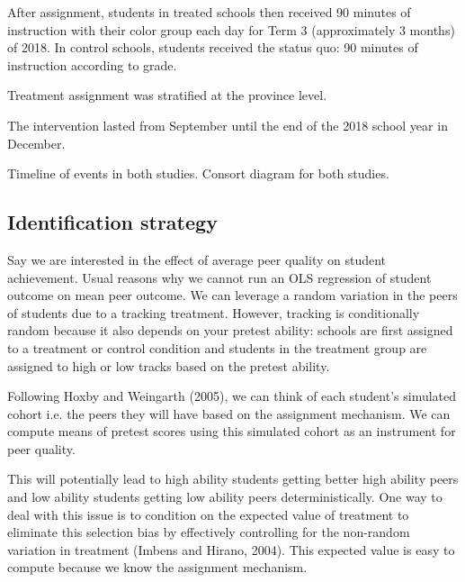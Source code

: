 \documentclass[11pt]{article}
\begin{document}
After assignment, students in treated schools then received 90 minutes of instruction with their color group each day for Term 3 (approximately 3 months) of 2018. In control schools, students received the status quo: 90 minutes of instruction according to grade.

Treatment assignment was stratified at the province level. 

The intervention lasted from September until the end of the 2018 school year in December. 

Timeline of events in both studies.
Consort diagram for both studies.

\subsection{Identification strategy}

Say we are interested in the effect of average peer quality on student achievement. Usual reasons why we cannot run an OLS regression of student outcome on mean peer outcome. We can leverage a random variation in the peers of students due to a tracking treatment. However, tracking is conditionally random because it also depends on your pretest ability: schools are first assigned to a treatment or control condition and students in the treatment group are assigned to high or low tracks based on the pretest ability. 

Following Hoxby and Weingarth (2005), we can think of each student's simulated cohort i.e. the peers they will have based on the assignment mechanism. We can compute means of pretest scores using this simulated cohort as an instrument for peer quality. 

This will potentially lead to high ability students getting better high ability peers and low ability students getting low ability peers deterministically. One way to deal with this issue is to condition on the expected value of treatment to eliminate this selection bias by effectively controlling for the non-random variation in treatment (Imbens and Hirano, 2004). This expected value is easy to compute because we know the assignment mechanism. 

\singlespacing

\end{document}
